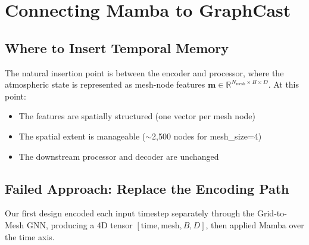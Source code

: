\documentclass[11pt,a4paper]{article}
\begin{document}
\section{Connecting Mamba to GraphCast}

\subsection{Where to Insert Temporal Memory}

The natural insertion point is between the encoder and processor, where the atmospheric state is represented as mesh-node features $\mathbf{m} \in \mathbb{R}^{N_\text{mesh} \times B \times D}$. At this point:
\begin{itemize}[nosep]
  \item The features are spatially structured (one vector per mesh node)
  \item The spatial extent is manageable ($\sim$2,500 nodes for mesh\_size=4)
  \item The downstream processor and decoder are unchanged
\end{itemize}

\subsection{Failed Approach: Replace the Encoding Path}

Our first design encoded each input timestep separately through the Grid-to-Mesh GNN, producing a 4D tensor $[\text{time}, \text{mesh}, B, D]$, then applied Mamba over the time axis.
\end{document}
